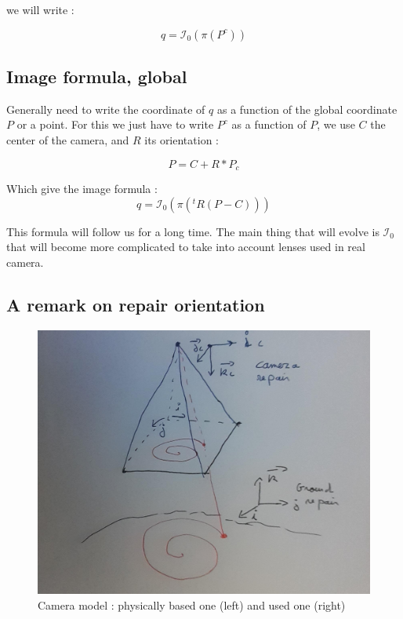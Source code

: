 we will write :

\begin{equation}
	q  =   \mathcal{I}_0 (\pi (P^c))
\end{equation}


\subsection{Image formula, global}

Generally need to write the coordinate of $q$ as a function of the global coordinate $P$ or a point.
For this we just have to write $P^c$ as a function of $P$, we use $C$ the center of the camera, and
$R$ its orientation :

\begin{equation}
	P =  C+ R *P_c
\end{equation}

Which give the image formula :
\begin{equation}
	q  =   \mathcal{I}_0 (\pi (^t R (P - C))) \label{FormImage0}
\end{equation}

This formula will follow us for a long time. The main thing that will evolve is $\mathcal{I}_0$
that will become more complicated to take into account lenses used in real camera.


\subsection{A remark on repair orientation}

\begin{figure}
\centering
	\includegraphics[width=12cm]{Methods/Images/RepairCam.jpg}
	\caption{Camera model : physically based one (left) and used one (right)}
	\label{fig:FormIm}
\end{figure}

